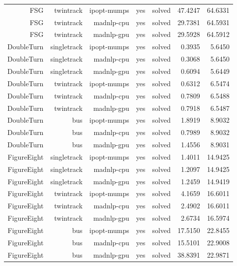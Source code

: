 {\begin{longtable}{|r|r|r|r|r|r|r|}
  FSG & twintrack & ipopt-mumps & yes & solved & 47.4247 & 64.6331 \\
  FSG & twintrack & madnlp-cpu & yes & solved & 29.7381 & 64.5931 \\
  FSG & twintrack & madnlp-gpu & yes & solved & 29.5928 & 64.5912 \\
  DoubleTurn & singletrack & ipopt-mumps & yes & solved & 0.3935 & 5.6450 \\
  DoubleTurn & singletrack & madnlp-cpu & yes & solved & 0.3068 & 5.6450 \\
  DoubleTurn & singletrack & madnlp-gpu & yes & solved & 0.6094 & 5.6449 \\
  DoubleTurn & twintrack & ipopt-mumps & yes & solved & 0.6312 & 6.5474 \\
  DoubleTurn & twintrack & madnlp-cpu & yes & solved & 0.7809 & 6.5488 \\
  DoubleTurn & twintrack & madnlp-gpu & yes & solved & 0.7918 & 6.5487 \\
  DoubleTurn & bus & ipopt-mumps & yes & solved & 1.8919 & 8.9032 \\
  DoubleTurn & bus & madnlp-cpu & yes & solved & 0.7989 & 8.9032 \\
  DoubleTurn & bus & madnlp-gpu & yes & solved & 1.4556 & 8.9031 \\
  FigureEight & singletrack & ipopt-mumps & yes & solved & 1.4011 & 14.9425 \\
  FigureEight & singletrack & madnlp-cpu & yes & solved & 1.2097 & 14.9425 \\
  FigureEight & singletrack & madnlp-gpu & yes & solved & 1.2459 & 14.9419 \\
  FigureEight & twintrack & ipopt-mumps & yes & solved & 4.1659 & 16.6011 \\
  FigureEight & twintrack & madnlp-cpu & yes & solved & 2.4902 & 16.6011 \\
  FigureEight & twintrack & madnlp-gpu & yes & solved & 2.6734 & 16.5974 \\
  FigureEight & bus & ipopt-mumps & yes & solved & 17.5150 & 22.8455 \\
  FigureEight & bus & madnlp-cpu & yes & solved & 15.5101 & 22.9008 \\
  FigureEight & bus & madnlp-gpu & yes & solved & 38.8391 & 22.9871 \\
  \hline
\end{longtable}
}
